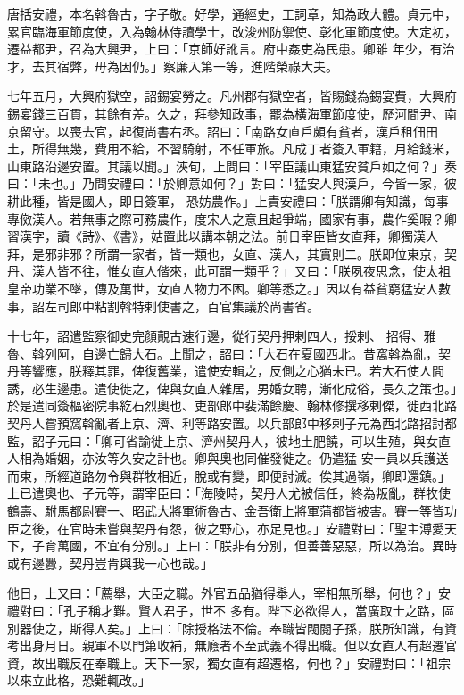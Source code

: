 \begin{pinyinscope}
 唐括安禮，本名斡魯古，字子敬。好學，通經史，工詞章，知為政大體。貞元中，累官臨海軍節度使，入為翰林侍讀學士，改浚州防禦使、彰化軍節度使。大定初，遷益都尹，召為大興尹，上曰：「京師好訛言。府中姦吏為民患。卿雖
 年少，有治才，去其宿弊，毋為因仍。」察廉入第一等，進階榮祿大夫。



 七年五月，大興府獄空，詔錫宴勞之。凡州郡有獄空者，皆賜錢為錫宴費，大興府錫宴錢三百貫，其餘有差。久之，拜參知政事，罷為橫海軍節度使，歷河間尹、南京留守。以喪去官，起復尚書右丞。詔曰：「南路女直戶頗有貧者，漢戶租佃田土，所得無幾，費用不給，不習騎射，不任軍旅。凡成丁者簽入軍籍，月給錢米，山東路沿邊安置。其議以聞。」浹旬，上問曰：「宰臣議山東猛安貧戶如之何？」奏曰：「未也。」乃問安禮曰：「於卿意如何？」對曰：「猛安人與漢戶，今皆一家，彼耕此種，皆是國人，即日簽軍，
 恐妨農作。」上責安禮曰：「朕謂卿有知識，每事專傚漢人。若無事之際可務農作，度宋人之意且起爭端，國家有事，農作奚暇？卿習漢字，讀《詩》、《書》，姑置此以講本朝之法。前日宰臣皆女直拜，卿獨漢人拜，是邪非邪？所謂一家者，皆一類也，女直、漢人，其實則二。朕即位東京，契丹、漢人皆不往，惟女直人偕來，此可謂一類乎？」又曰：「朕夙夜思念，使太祖皇帝功業不墜，傳及萬世，女直人物力不困。卿等悉之。」因以有益貧窮猛安人數事，詔左司郎中粘割斡特剌使書之，百官集議於尚書省。



 十七年，詔遣監察御史完顏覿古速行邊，從行契丹押剌四人，挼剌、
 招得、雅魯、斡列阿，自邊亡歸大石。上聞之，詔曰：「大石在夏國西北。昔窩斡為亂，契丹等響應，朕釋其罪，俾復舊業，遣使安輯之，反側之心猶未已。若大石使人間誘，必生邊患。遣使徙之，俾與女直人雜居，男婚女聘，漸化成俗，長久之策也。」於是遣同簽樞密院事紇石烈奧也、吏部郎中裴滿餘慶、翰林修撰移剌傑，徙西北路契丹人嘗預窩斡亂者上京、濟、利等路安置。以兵部郎中移剌子元為西北路招討都監，詔子元曰：「卿可省諭徙上京、濟州契丹人，彼地土肥饒，可以生殖，與女直人相為婚姻，亦汝等久安之計也。卿與奧也同催發徙之。仍遣猛
 安一員以兵護送而東，所經道路勿令與群牧相近，脫或有變，即便討滅。俟其過嶺，卿即還鎮。」上已遣奧也、子元等，謂宰臣曰：「海陵時，契丹人尤被信任，終為叛亂，群牧使鶴壽、駙馬都尉賽一、昭武大將軍術魯古、金吾衛上將軍蒲都皆被害。賽一等皆功臣之後，在官時未嘗與契丹有怨，彼之野心，亦足見也。」安禮對曰：「聖主溥愛天下，子育萬國，不宜有分別。」上曰：「朕非有分別，但善善惡惡，所以為治。異時或有邊釁，契丹豈肯與我一心也哉。」



 他日，上又曰：「薦舉，大臣之職。外官五品猶得舉人，宰相無所舉，何也？」安禮對曰：「孔子稱才難。賢人君子，世不
 多有。陛下必欲得人，當廣取士之路，區別器使之，斯得人矣。」上曰：「除授格法不倫。奉職皆閥閱子孫，朕所知識，有資考出身月日。親軍不以門第收補，無廕者不至武義不得出職。但以女直人有超遷官資，故出職反在奉職上。天下一家，獨女直有超遷格，何也？」安禮對曰：「祖宗以來立此格，恐難輒改。」




\end{pinyinscope}
